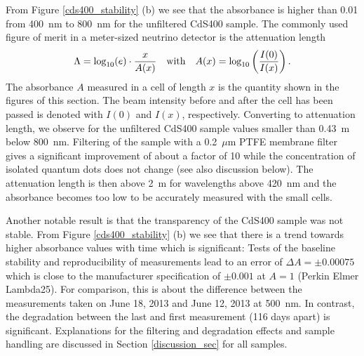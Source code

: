 \documentclass[cits]{JINST}
\begin{document}
From Figure \ref{cds400_stability} (b) we see that the absorbance is higher than 0.01 from 400~nm to 800~nm for the unfiltered CdS400 sample. The commonly used figure of merit in a meter-sized neutrino detector is the attenuation length
\begin{equation}
\Lambda = \textnormal{log}_{10}(e) \cdot \frac{x}{A(x)} \quad \textnormal{with} \quad A(x) = \textnormal{log}_{10} \left( \frac{I(0)}{I(x)} \right).   
\end{equation}  
The absorbance $A$ measured in a cell of length $x$ is the quantity shown in the figures of this section. The beam intensity before and after the cell has been passed is denoted with $I(0)$ and $I(x)$, respectively. Converting to attenuation length, we observe for the unfiltered CdS400 sample values smaller than 0.43~m below 800~nm. Filtering of the sample with a 0.2~$\mu$m PTFE membrane filter gives a significant improvement of about a factor of 10 while the concentration of isolated quantum dots does not change (see also discussion below). The attenuation length is then above 2~m for wavelengths above 420~nm and the absorbance becomes too low to be accurately measured with the small cells. 
 
Another notable result is that the transparency of the CdS400 sample was not stable. From Figure \ref{cds400_stability} (b) we see that there is a trend towards higher absorbance values with time which is significant: Tests of the baseline stability and reproducibility of measurements lead to an error of $\Delta A = \pm 0.00075$ which is close to the manufacturer specification of $\pm 0.001$ at $A=1$ (Perkin Elmer Lambda25). For comparison, this is about the difference between the measurements taken on June 18, 2013 and June 12, 2013 at 500~nm. In contrast, the degradation between the last and first measurement (116 days apart) is significant. Explanations for the filtering and degradation effects and sample handling are discussed in Section \ref{discussion_sec} for all samples.  
\end{document}
